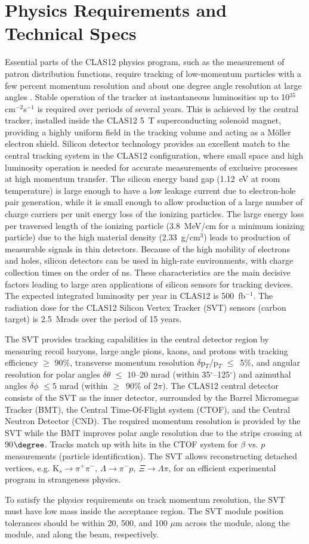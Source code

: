 \section{Physics Requirements and Technical Specs}
Essential parts of the CLAS12 physics program, such as the measurement of patron distribution functions, require tracking of low-momentum  particles with a few percent momentum resolution and about one degree angle resolution at large angles \cite{TDR12}. Stable operation of the tracker at instantaneous luminosities up to 10$^{35}~$cm$^{-2}$s$^{-1}$ is required over periods of several years. This is achieved by the central tracker, installed inside the CLAS12 5~T superconducting solenoid magnet,  providing a highly uniform field in the tracking volume and acting as a M\"oller electron shield. Silicon detector technology provides an excellent match to the central tracking system in the CLAS12 configuration, where small space and high luminosity operation is needed for accurate measurements of exclusive processes at high momentum transfer. The silicon energy band gap (1.12~eV at room temperature) is large enough to have a low leakage current due to electron-hole pair generation, while it is small enough to allow production of a large number of charge carriers per unit energy loss of the ionizing particles. The large energy loss per traversed length of the ionizing particle (3.8~MeV/cm for a minimum ionizing particle) due to the high material density (2.33~g/cm$^3$) leads to production of  measurable signals in thin detectors. Because of the high mobility of electrons and holes, silicon detectors can be used in high-rate environments, with charge collection times on the order of ns. These characteristics are the main decisive factors leading to large area applications of silicon sensors for tracking devices. The expected integrated luminosity per year in CLAS12 is 500~fb$^{-1}$. The radiation dose for the CLAS12 Silicon Vertex Tracker (SVT) sensors (carbon target) is 2.5~Mrads over the period of 15 years.

The SVT provides tracking capabilities in the central detector region by measuring recoil baryons, large angle pions,  kaons, and protons with tracking efficiency $\ge$ 90$\%$, transverse momentum resolution $\delta$p$_{T}$/p$_{T}$ $\le$~5$\%$, and angular resolution for polar angles $\delta$$\theta$ $\le$ 10--20 mrad (within 35$^\circ$--125$^\circ$) and azimuthal angles $\delta$$\phi$ $\le5$ mrad (within $\ge$~90$\%$ of 2$\pi$). The CLAS12 central detector consists of the SVT as the inner detector, surrounded by the Barrel Micromegas Tracker (BMT), the Central Time-Of-Flight system (CTOF), and the Central Neutron Detector (CND). The required momentum resolution is provided by the SVT while the BMT improves polar angle resolution due to the strips crossing at 90$\degree$. Tracks match up with hits in the CTOF system for $\beta$ vs. $p$ measurements (particle identification). The SVT allows reconstructing detached vertices, e.g. K$_{s}\!\to\!\pi^{+}\pi^{-},~\Lambda\!\to\!\pi^{-}p,~\Xi\!\to\!\Lambda\pi$, for an efficient experimental program in strangeness physics.  

To satisfy the physics requirements on track momentum resolution, the SVT must have low mass inside the acceptance region. The SVT module position tolerances should be within 20, 500, and 100 $\mu$m across the module, along the module, and along the beam, respectively.
